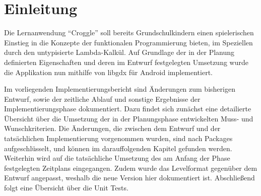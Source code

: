 \chapter{Einleitung}
Die Lernanwendung "`Croggle"' soll bereits Grundschulkindern einen spielerischen Einstieg in die Konzepte der funktionalen Programmierung bieten, im Speziellen durch den untypisierte Lambda-Kalkül.
Auf Grundlage der in der Planung definierten Eigenschaften und deren im Entwurf festgelegten Umsetzung wurde die Applikation nun mithilfe von libgdx für Android implementiert.

Im vorliegenden Implementierungsbericht sind Änderungen zum bisherigen Entwurf, sowie der zeitliche Ablauf und sonstige Ergebnisse der Implementierungsphase dokumentiert.
Dazu findet sich zunächst eine detailierte Übersicht über die Umsetzung der in der Planungsphase entwickelten Muss- und Wunschkriterien.
Die Änderungen, die zwischen dem Entwurf und der tatsächlichen Implementierung vorgenommen wurden, sind nach Packages aufgeschlüsselt, und können im darauffolgenden Kapitel gefunden werden.
Weiterhin wird auf die tatsächliche Umsetzung des am Anfang der Phase festgelegten Zeitplans eingegangen.
Zudem wurde das Levelformat gegenüber dem Entwurf angepasst, weshalb die neue Version hier dokumentiert ist.
Abschließend folgt eine Übersicht über die Unit Tests.

